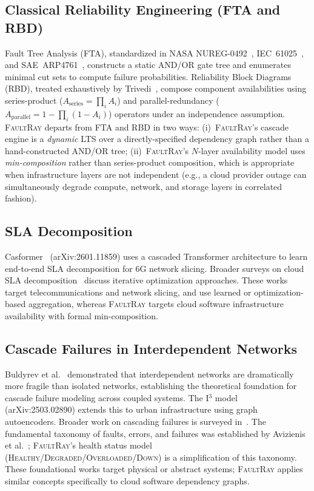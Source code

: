 \documentclass[10pt,twocolumn]{article}
\begin{document}
\subsection{Classical Reliability Engineering (FTA and RBD)}
\label{sec:rw-fta-rbd}
Fault Tree Analysis (FTA), standardized in NASA NUREG-0492~\cite{nasa-fta},
IEC~61025~\cite{iec61025}, and SAE~ARP4761~\cite{arp4761}, constructs
a static AND/OR gate tree and enumerates minimal cut sets to compute
failure probabilities. Reliability Block Diagrams (RBD), treated
exhaustively by Trivedi~\cite{trivedi2001}, compose component
availabilities using series-product
($A_{\text{series}} = \prod_i A_i$) and parallel-redundancy
($A_{\text{parallel}} = 1 - \prod_i (1 - A_i)$) operators under an
independence assumption.
\textsc{FaultRay} departs from FTA and RBD in two ways:
(i)~\textsc{FaultRay}'s cascade engine is a \emph{dynamic} LTS over
a directly-specified dependency graph rather than a hand-constructed
AND/OR tree;
(ii)~\textsc{FaultRay}'s $N$-layer availability model uses
\emph{min-composition} rather than series-product composition, which
is appropriate when infrastructure layers are not independent
(e.g., a cloud provider outage can simultaneously degrade compute,
network, and storage layers in correlated fashion).

\subsection{SLA Decomposition}
\label{sec:rw-sla}
Casformer~\cite{casformer2025} (arXiv:2601.11859) uses a cascaded
Transformer architecture to learn end-to-end SLA decomposition for
6G network slicing. Broader surveys on cloud SLA
decomposition~\cite{sla-survey-2024} discuss iterative optimization
approaches. These works target telecommunications and network
slicing, and use learned or optimization-based aggregation,
whereas \textsc{FaultRay} targets cloud software infrastructure
availability with formal min-composition.

\subsection{Cascade Failures in Interdependent Networks}
Buldyrev et al.~\cite{buldyrev2010} demonstrated that
interdependent networks are dramatically more fragile than
isolated networks, establishing the theoretical foundation for
cascade failure modeling across coupled systems. The I$^3$
model~\cite{iii-model-2025} (arXiv:2503.02890) extends this to
urban infrastructure using graph autoencoders. Broader work on
cascading failures is surveyed in~\cite{pnas-cascade-2019}. The
fundamental taxonomy of faults, errors, and failures was
established by Avizienis et al.~\cite{avizienis2004}; \textsc{FaultRay}'s
health status model (\textsc{Healthy}/\textsc{Degraded}/\textsc{Overloaded}/\textsc{Down})
is a simplification of this taxonomy. These foundational works
target physical or abstract systems; \textsc{FaultRay} applies
similar concepts specifically to cloud software dependency graphs.
\end{document}
